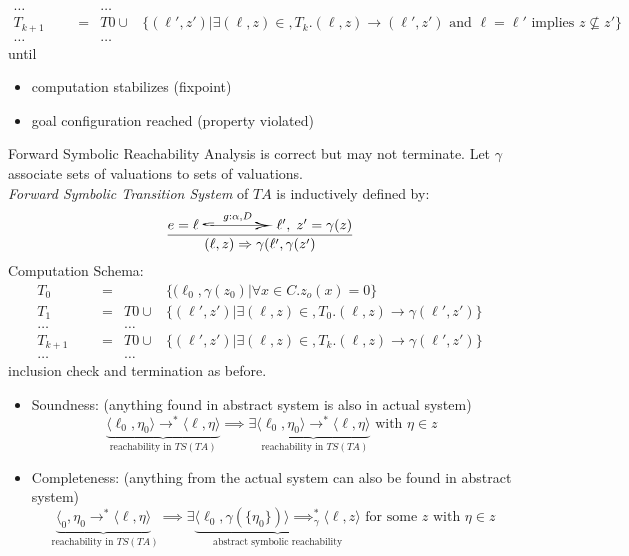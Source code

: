 \documentclass[a4paper, 10pt]{article}
\newcommand{\underbraceset}[2]{\underset{#1}{\underbrace{#2}}}
\begin{document}
\begin{mdframed}
\begin{align*}
\dots &&& &\dots \\
T_{k+1} &&&= &T0\cup &\{(\ell',z') | \exists(\ell,z)\in,T_k.(\ell,z)\rightarrow(\ell',z') \text{ and } \ell=\ell' \text{ implies } z\not\subseteq z'\} \\
\dots &&& &\dots
\end{align*}
until
\begin{itemize}
    \item computation stabilizes (fixpoint)
    \item goal configuration reached (property violated)
\end{itemize}
Forward Symbolic Reachability Analysis is correct but may not terminate.
Let $\gamma$ associate sets of valuations to sets of valuations. \\
\emph{Forward Symbolic Transition System} of $TA$ is inductively defined by:
\[ \frac{
    e=\ell \overset{g:\alpha, D}{\scalebox{5}[1]{$\hookrightarrow$}} \ell',\; z'=\gamma(z)
}{
    (\ell,z)\Rightarrow \gamma(\ell',\gamma(z')
} \]
Computation Schema:
\begin{align*}
T_0 &&&= &&\{(\ell_0,\gamma(z_0) | \forall x\in C.z_o(x)=0\} \\
T_1 &&&= &T0\cup &\{(\ell',z') | \exists(\ell,z)\in,T_0.(\ell,z)\rightarrow\gamma(\ell',z') \} \\
\dots &&& &\dots \\
T_{k+1} &&&= &T0\cup &\{(\ell',z') | \exists(\ell,z)\in,T_k.(\ell,z)\rightarrow\gamma(\ell',z')\} \\
\dots &&& &\dots
\end{align*}
inclusion check and termination as before.
\begin{itemize}
    \item Soundness: (anything found in abstract system is also in actual system)
    \[
    \underbraceset{\text{reachability in } TS(TA)}{\langle\ell_0,\eta_0\rangle\to^*\langle\ell,\eta\rangle}
    \implies
    \exists\underbraceset{\text{ reachability in } TS(TA)}{\langle\ell_0,\eta_0\rangle\to^*\langle\ell,\eta\rangle} \text{ with } \eta\in z
     \]
    \item Completeness: (anything from the actual system can also be found in abstract system)
    \[
    \underbraceset{\text{ reachability in } TS(TA)}{\langle_0,\eta_0\to^*\langle\ell,\eta\rangle}
    \implies
     \exists\underbraceset{\text{abstract symbolic reachability}}{\langle\ell_0,\gamma(\{\eta_0\})\rangle\implies^*_\gamma\langle\ell,z\rangle} \text{ for some $z$ with } \eta\in z \]

\end{itemize}
\end{mdframed}
\end{document}
